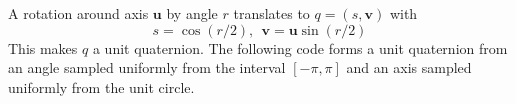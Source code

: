 A rotation around axis $\bm u$ by angle $r$ translates to $q=(s,\bm v)$ with
\[
s = \cos{(r/2)},  \ \ \bm v = \bm u \sin {(r/2)}
\]
This makes $q$ a unit quaternion.  The following code forms a unit quaternion from an angle sampled uniformly from the interval $[-\pi,\pi]$ and an axis sampled uniformly from the unit circle.



% 
% 
% 

